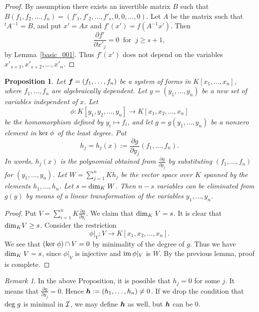 \documentclass[12pt]{article}
\newtheorem{proposition}[theorem]{Proposition}
\theoremstyle{definition}
\theoremstyle{remark}
\newtheorem{remark}[theorem]{Remark}
\def\dim{{\rm dim}}
\def\im{{\rm im}}
\def\ker{{\rm ker}}
\def\deg{{\rm deg}}
\def\cI{{\cal I}}
\def\boldh{\mbox{\boldmath $h$}}
\def\pa{\partial}
\begin{document}
\begin{proof}
By assumption there exists an invertible matrix $B$ such that  
$B(f_1, f_2, \ldots, f_n)= (f'_1, f'_2, \ldots, f'_{s}, 0,0, \allowbreak \ldots, 0).$
Let $A$ be the matrix such that ${}^tA^{-1}=B$,  and put $x'=Ax$ and  $f'(x')=f(A^{-1}x')$. 
Then \[\frac{\pa f'}{\pa x'_j}=0 \ \mbox{ for }\ j \geq s+1, \]
 by Lemma~\ref{basic_001}. 
Thus $f'(x')$ does not depend on the variables $x'_{s+1}, x'_{s+2}, \ldots, x'_n$.   
\end{proof}

\begin{proposition} \label{num_of_var_involved_2} %
Let $\mbox{\boldmath $f$} = (f_1, \ldots, f_n)$ be a system of forms in $K[x_1, \ldots, x_n]$, where 
$f_1, \ldots, f_n$ are algebraically dependent.  Let $y=(y_1, \ldots, y_n)$  be a new set of variables 
independent of $x$.  
Let \[\phi : K[y_1, y_2, \ldots, y_n] \rightarrow K[x_1, x_2, \ldots, x_n]\] 
be the homomorphism defined by $y_i \mapsto f_i$, and   
let $g=g(y_1,\ldots, y_n)$ be a nonzero element in $\ker\;  \phi$ of the least degree. 
Put 
\[h_j=h_j(x):=\frac{\pa g}{\pa y_j}(f_1, \ldots, f_n).\]
In words, $h_j(x)$  is the polynomial obtained from $\frac{\pa g}{\pa y_j}$ by substituting 
$(f_1, \ldots, f_n)$ for $(y_1, \ldots, \allowbreak y_n)$.
Let $W=\sum _{j=1}^nKh_j$ be the vector space over $K$ spanned by 
the elements $h_1, \ldots, h_n$.   
Let $s=\dim _K \; W$.  Then 
$n-s$ variables can be eliminated from $g(y)$ by means of a linear 
transformation of the variables $y_1, \ldots, y_n$.   
\end{proposition}   
\begin{proof}
Put $V=\sum _{i=1} ^n K\frac{\pa g}{\pa y_i}$.  
We claim that  $\dim _K \; V = s$.  
It is clear that  $\dim _K V \geq s$. 
Consider the restriction  
\[\phi|_V: V \rightarrow K[x_1, x_2, \ldots, x_n]. \]
We see that 
$(\ker \; \phi) \cap V =0$ by minimality of the degree of $g$.  
Thus we have $\dim _K\; V=s$,  since  $\phi | _V$ is injective 
and $\im \, \phi|_V$ is $W$.   By the previous lemma, proof is complete. 
\end{proof}

\begin{remark} \label{non_vanishing_of_boldh}   %
In the above Proposition,  it is possible that $h_j=0$ for some $j$.  
It means that $\frac{\pa g}{\pa y_j}=0$.
Hence $\boldh :=(h_1, \ldots, h_n) \neq 0$.  
If we drop the condition that $\deg \; g$ is minimal in  $\cI$, 
we may define $\boldh$ as well, but $\boldh$  can be $0$.   
%
\end{remark}
\end{document}

